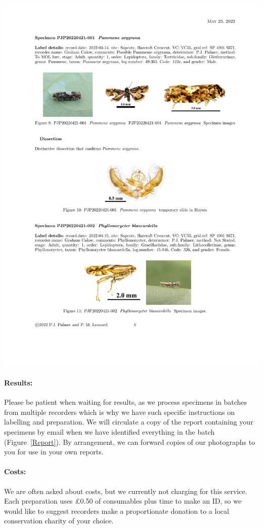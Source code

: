 \documentclass[12pt]{article}
\begin{document}
	\begin{center}
	\centering
	\includegraphics[width=0.6\linewidth]{images/samplepage}\hfill
	
	\label{Report}
\end{center}
\paragraph{Results:}Please be patient when waiting for results, as we process specimens in batches from multiple recorders which is why we have such specific instructions on labelling and preparation. We will circulate a copy of the report containing your specimens by email when we have identified everything in the batch (Figure~\ref{Report}). By arrangement, we can forward copies of our photographs to you for use in your own reports.

\paragraph{Costs:}We are often asked about costs, but we currently not charging for this service.  Each preparation uses \pounds 0.50 of consumables plus time to make an ID, so we would like to suggest recorders make a proportionate donation to a local conservation charity of your choice. 

\end{document}
